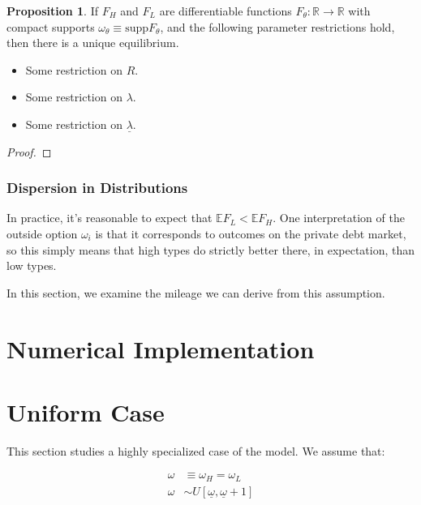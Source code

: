 \documentclass{article}
\theoremstyle{definition}
\newtheorem{proposition}{Proposition}
\begin{document}
\begin{proposition}
If $F_H$ and $F_L$ are differentiable functions $F_\theta: \mathbb{R} \to \mathbb{R}$ with compact supports $\omega_\theta \equiv \text{supp}F_\theta$, and the following parameter restrictions hold, then there is a unique equilibrium. 

\begin{itemize}
    \item Some restriction on $R$. 
    \item Some restriction on $\lambda$.
    \item Some restriction on $\underline{\lambda}$.
\end{itemize}
\end{proposition}

\begin{proof}
\end{proof}

\subsubsection{Dispersion in Distributions}

In practice, it's reasonable to expect that $\mathbb{E} F_L < \mathbb{E} F_H$. One interpretation of the outside option $\omega_i$ is that it corresponds to outcomes on the private debt market, so this simply means that high types do strictly better there, in expectation, than low types. 

In this section, we examine the mileage we can derive from this assumption. 

\newpage

\section{Numerical Implementation}

\newpage 

\section{Uniform Case}

This section studies a highly specialized case of the model. We assume that:

\begin{align*}
    \omega &\equiv \omega_H = \omega_L \\
    \omega &\sim U[\underline{\omega}, \underline{\omega} + 1]
\end{align*}
\end{document}
